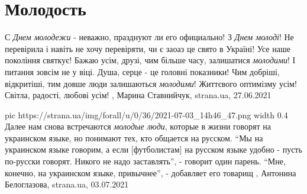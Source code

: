  
 
 
 
 
\chapter{Молодость}
\label{sec:slova.molodost}

С \emph{Днем молодежи} - неважно, празднуют ли его официально!  З \emph{Днем молоді}!  Не
перевірила і навіть не хочу перевіряти, чи є заоаз це свято в Україні!  Усе
наше покоління святкує!  Бажаю усім, друзі, чим більше часу, залишатися
\emph{молодими}!  І питання зовсім не у віці.  Душа, серце - це головні показники!
Чим добріші, відкритіші, тим довше люди залишаються \emph{молодими}!  Життєвого
оптимізму усім!  Світла, радості, любові усім!
, 
Марина Ставнийчук, strana.ua, 27.06.2021

\ifcmt
  pic https://strana.ua/img/forall/u/0/36/2021-07-03_14h46_47.png
	width 0.4
\fi
Далее нам снова встречаются \emph{молодые люди}, которые в жизни говорят на
украинском языке, но понимают тех, кто общается на русском. 
\enquote{Мы на украинском языке говорим, а если [футболистам] на русском языке удобно -
пусть по-русски говорят. Никого не надо заставлять}, - говорит один парень. 
\enquote{Мне, конечно, на украинском языке, привычнее}, - добавляет его товарищ
, 
Антонина Белоглазова, strana.ua, 03.07.2021

